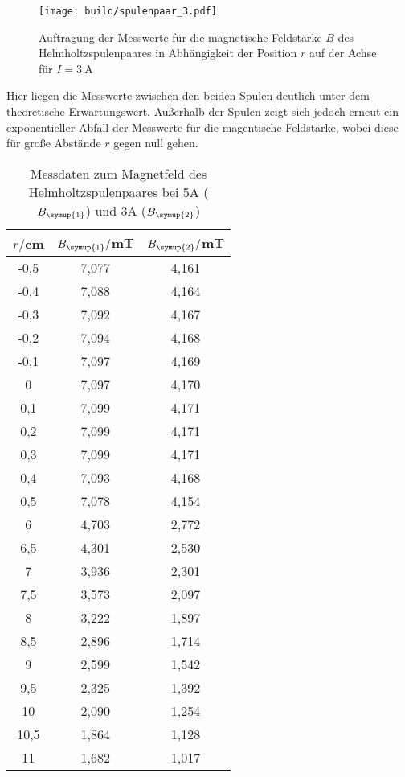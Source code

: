\begin{figure}
  \centering
  \texttt{[image: build/spulenpaar\_3.pdf]}
  \caption{Auftragung der Messwerte für die magnetische Feldstärke $B$ des Helmholtzspulenpaares
  in Abhängigkeit der Position $r$ auf der Achse für $I=\SI{3}{\ampere}$}
  \label{fig:spulenpaar_3}
\end{figure}

Hier liegen die Messwerte zwischen den beiden Spulen deutlich unter dem
theoretische Erwartungswert. Außerhalb der Spulen zeigt sich jedoch erneut ein
exponentieller Abfall der Messwerte für die magentische Feldstärke, wobei diese für
große Abstände $r$ gegen null gehen.


\begin{table}
  \centering
  \caption{Messdaten zum Magnetfeld des Helmholtzspulenpaares bei 5A ($B_{\symup{1}}$)
  und 3A ($B_{\symup{2}}$)}
  \label{tab:helmholtz}
  \begin{tabular}{c c c}
    \toprule
    $r/$cm & $B_{\symup{1}}/$mT & $B_{\symup{2}}/$mT\\
    \midrule
    -0,5	&  7,077 & 4,161\\
    -0,4	&  7,088 & 4,164\\
    -0,3	&  7,092 & 4,167\\
    -0,2	&  7,094 & 4,168\\
    -0,1	&  7,097 & 4,169\\
    0	    &  7,097 & 4,170\\
    0,1	  &  7,099 & 4,171\\
    0,2	  &  7,099 & 4,171\\
    0,3	  &  7,099 & 4,171\\
    0,4	  &  7,093 & 4,168\\
    0,5	  &  7,078 & 4,154\\
    6	    &  4,703 & 2,772\\
    6,5	  &  4,301 & 2,530\\
    7	    &  3,936 & 2,301\\
    7,5	  &  3,573 & 2,097\\
    8	    &  3,222 & 1,897\\
    8,5	  &  2,896 & 1,714\\
    9	    &  2,599 & 1,542\\
    9,5 	&  2,325 & 1,392\\
    10	  &  2,090 & 1,254\\
    10,5	&  1,864 & 1,128\\
    11	  &  1,682 & 1,017\\

\end{tabular}
\end{table}
